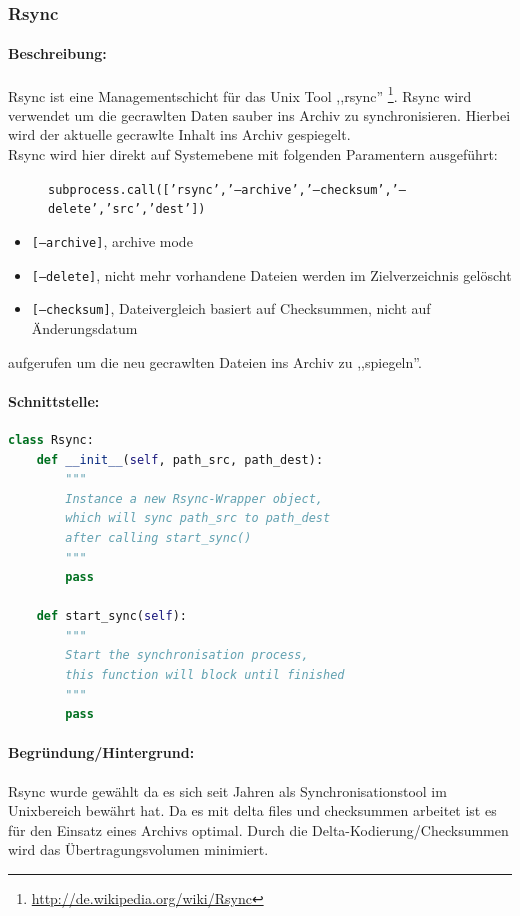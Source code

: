 \subsubsection{Rsync}
\label{ssub:rsync}
\paragraph{Beschreibung:}
\label{par:beschreibung_}
Rsync ist eine Managementschicht für das Unix Tool ,,rsync'' \footnote{\url{http://de.wikipedia.org/wiki/Rsync}}. Rsync wird verwendet um die gecrawlten Daten sauber ins Archiv zu synchronisieren.
Hierbei wird der aktuelle gecrawlte Inhalt ins Archiv gespiegelt.
\\
Rsync wird hier direkt auf Systemebene mit folgenden Paramentern ausgeführt:
\begin{figure}[H]
    \centering    
    \texttt{subprocess.call(['rsync','--archive','--checksum','--delete','src','dest'])}
\end{figure}

\begin{itemize}
    \item \texttt{[--archive]}, archive mode
    \item \texttt{[--delete]}, nicht mehr vorhandene Dateien werden im Zielverzeichnis gelöscht
    \item \texttt{[--checksum]}, Dateivergleich basiert auf Checksummen, nicht auf Änderungsdatum
\end{itemize}
aufgerufen um die neu gecrawlten Dateien ins Archiv zu ,,spiegeln''.

\paragraph{Schnittstelle:}
\label{par:schnittstelle_}
\hfill
\begin{lstlisting}[language=python]
class Rsync:
    def __init__(self, path_src, path_dest):
        """
        Instance a new Rsync-Wrapper object,
        which will sync path_src to path_dest
        after calling start_sync() 
        """
        pass

    def start_sync(self):
        """
        Start the synchronisation process,
        this function will block until finished
        """
        pass
\end{lstlisting}

\paragraph{Begründung/Hintergrund:}
\label{par:begr_ndung_hintergrund_}
Rsync wurde gewählt da es sich seit Jahren als Synchronisationstool im Unixbereich bewährt hat.
Da es mit delta files und checksummen arbeitet ist es für den Einsatz eines Archivs optimal.
Durch die Delta-Kodierung/Checksummen wird das Übertragungsvolumen minimiert.

